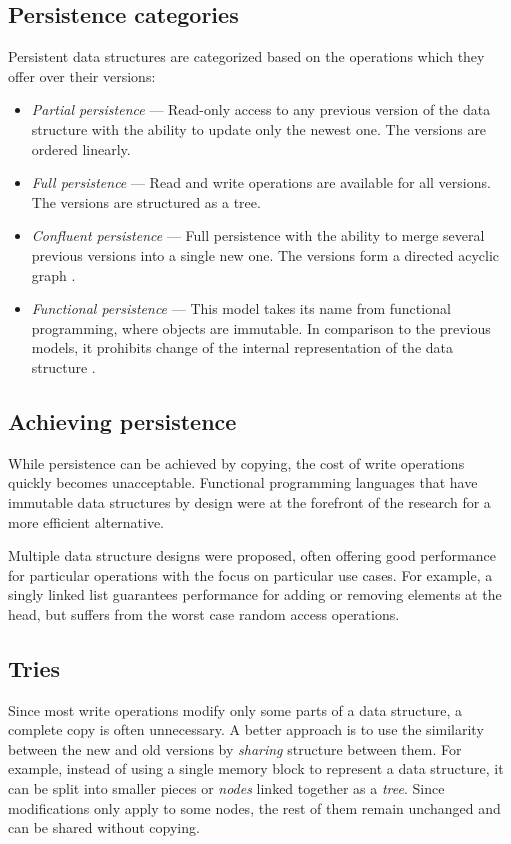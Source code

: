\subsection{Persistence categories}
Persistent data structures are categorized based on the operations which they offer over their versions:
\begin{itemize}
    \item \textit{Partial persistence} --- Read-only access to any previous version of the data structure with the ability to update only the newest one. The versions are ordered linearly.
    \item \textit{Full persistence} --- Read and write operations are available for all versions. The versions are structured as a tree.
    \item \textit{Confluent persistence} --- Full persistence with the ability to merge several previous versions into a single new one. The versions form a directed acyclic graph \cite{fully-persistent-lists-with-catenation}.
    \item \textit{Functional persistence} --- This model takes its name from functional programming, where objects are immutable. In comparison to the previous models, it prohibits change of the internal representation of the data structure \cite{purely-functional-data-structures}.
\end{itemize}

\subsection{Achieving persistence}
While persistence can be achieved by copying, the cost of write operations quickly becomes unacceptable. Functional programming languages that have immutable data structures by design were at the forefront of the research for a more efficient alternative.

Multiple data structure designs were proposed, often offering good performance for particular operations with the focus on particular use cases. For example, a singly linked list guarantees  performance for adding or removing elements at the head, but suffers from the worst case  random access operations.

\subsection{Tries}
Since most write operations modify only some parts of a data structure, a complete copy is often unnecessary. A better approach is to use the similarity between the new and old versions by \emph{sharing} structure between them. For example, instead of using a single memory block to represent a data structure, it can be split into smaller pieces or \emph{nodes} linked together as a \emph{tree}. Since modifications only apply to some nodes, the rest of them remain unchanged and can be shared without copying.

